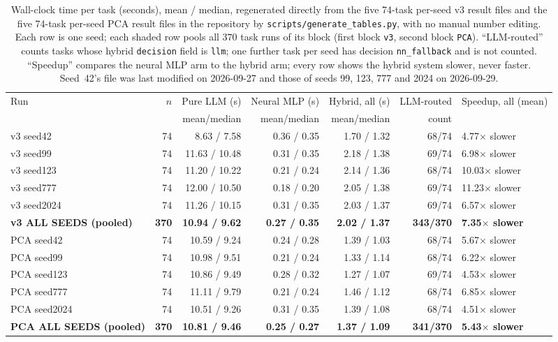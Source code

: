 \documentclass[twoside,11pt]{article}
\begin{document}
\begin{table}[htbp]
\centering
\small
\caption{Wall-clock time per task (seconds), mean / median, regenerated
directly from the five 74-task per-seed v3 result files and the five 74-task
per-seed PCA result files in the repository by \texttt{scripts/generate\_tables.py},
with no manual number editing. Each row is one seed; each shaded row pools all $370$
task runs of its block (first block \texttt{v3}, second block \texttt{PCA}).
``LLM-routed'' counts tasks whose hybrid \texttt{decision} field is
\texttt{llm}; one further task per seed has decision \texttt{nn\_fallback} and
is not counted. ``Speedup'' compares the neural MLP arm to the hybrid arm;
every row shows the hybrid system slower, never faster. Seed~42's file was last modified
on 2026-09-27 and those of seeds 99, 123, 777 and 2024 on 2026-09-29. }
\label{tab:timing_full}
\begin{tabular}{lrrrrrl}
\toprule
Run & $n$ & Pure LLM (s) & Neural MLP (s) & Hybrid, all (s) & LLM-routed & Speedup, all (mean) \\
    &     & mean/median  & mean/median    & mean/median      & count      &  \\
\midrule
v3 seed42 & 74 & 8.63 / 7.58 & 0.36 / 0.35 & 1.70 / 1.32 & 68/74 & 4.77$\times$ slower \\
v3 seed99 & 74 & 11.63 / 10.48 & 0.31 / 0.35 & 2.18 / 1.38 & 69/74 & 6.98$\times$ slower \\
v3 seed123 & 74 & 11.20 / 10.22 & 0.21 / 0.24 & 2.14 / 1.36 & 68/74 & 10.03$\times$ slower \\
v3 seed777 & 74 & 12.00 / 10.50 & 0.18 / 0.20 & 2.05 / 1.38 & 69/74 & 11.23$\times$ slower \\
v3 seed2024 & 74 & 11.26 / 10.15 & 0.31 / 0.35 & 2.03 / 1.37 & 69/74 & 6.57$\times$ slower \\
\rowcolor{black!8}
\textbf{v3 ALL SEEDS (pooled)} & \textbf{370} & \textbf{10.94 / 9.62} & \textbf{0.27 / 0.35} & \textbf{2.02 / 1.37} & \textbf{343/370} & \textbf{7.35$\times$ slower} \\
PCA seed42 & 74 & 10.59 / 9.24 & 0.24 / 0.28 & 1.39 / 1.03 & 68/74 & 5.67$\times$ slower \\
PCA seed99 & 74 & 10.98 / 9.51 & 0.21 / 0.24 & 1.33 / 1.14 & 68/74 & 6.22$\times$ slower \\
PCA seed123 & 74 & 10.86 / 9.49 & 0.28 / 0.32 & 1.27 / 1.07 & 69/74 & 4.53$\times$ slower \\
PCA seed777 & 74 & 11.11 / 9.79 & 0.21 / 0.24 & 1.46 / 1.12 & 68/74 & 6.85$\times$ slower \\
PCA seed2024 & 74 & 10.51 / 9.26 & 0.31 / 0.35 & 1.39 / 1.08 & 68/74 & 4.51$\times$ slower \\
\rowcolor{black!8}
\textbf{PCA ALL SEEDS (pooled)} & \textbf{370} & \textbf{10.81 / 9.46} & \textbf{0.25 / 0.27} & \textbf{1.37 / 1.09} & \textbf{341/370} & \textbf{5.43$\times$ slower} \\
\bottomrule
\end{tabular}
\end{table}
\end{document}
